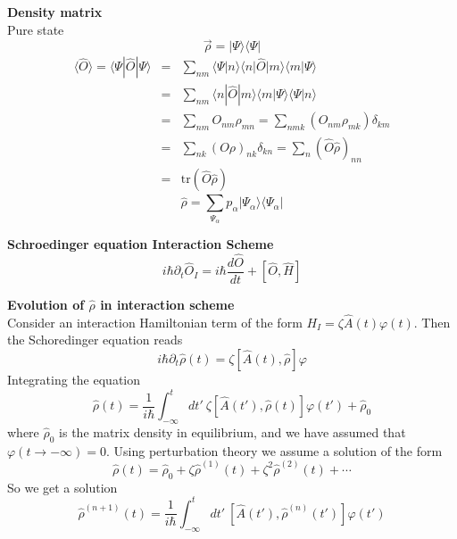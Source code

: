 \documentclass[12pt,a4paper]{article}
\newcommand{\dt}[1]{\frac{d #1}{dt}} %
\newcommand{\integral}[3]{\int_{#1}^{#2} d #3 \ } %
\begin{document}
\textbf{Density matrix}\\
Pure state
\begin{equation}
	\vec{\rho} = |\Psi \rangle \langle \Psi|
\end{equation}
\begin{eqnarray}
	\langle  \hat{O} \rangle = \langle \Psi | \hat{O}|\Psi \rangle & = & \sum_{nm} \langle \Psi |n \rangle \langle n | \hat{O}|m \rangle\langle m  |\Psi  \rangle \\
	& = & \sum_{nm}  \langle n | \hat{O}|m \rangle\langle m  |\Psi  \rangle \langle \Psi |n \rangle \\
	& = &\sum_{nm} O_{nm}\rho_{mn} = \sum_{nmk} (O_{nm}\rho_{mk})\delta_{km}\\
	& = & \sum_{nk} (O\rho)_{nk}\delta_{kn} = \sum_{n} (\hat{O}\hat{\rho})_{nn} \\
	& = & \text{tr}(\hat{O}\hat{\rho})
\end{eqnarray}
\begin{equation}
	\hat{\rho} = \sum_{\Psi_{\alpha}}p_{\alpha} |\Psi_{\alpha} \rangle \langle \Psi_{\alpha}|
\end{equation}

\textbf{Schroedinger equation Interaction Scheme}\\
\begin{equation}
	i\hbar\partial_t \hat{O}_I = i\hbar \dt{\hat{O}} + [\hat{O},\hat{H}]
\end{equation}

\textbf{Evolution of $\hat{\rho}$ in interaction scheme} \\
Consider an interaction Hamiltonian term of the form $H_I = \zeta \hat{A}(t)\varphi(t)$. Then the Schoredinger equation reads
\begin{equation}
	i\hbar\partial_t \hat{\rho}(t) = \zeta [\hat{A}(t),\hat{\rho}]\varphi
\end{equation}
Integrating the equation
\begin{equation}
	\hat{\rho}(t) = \frac{1}{i\hbar} \integral{-\infty}{t}{t'} \zeta [\hat{A}(t'),\hat{\rho}(t)]\varphi(t') + \hat{\rho}_0
\end{equation}
where $\hat{\rho}_0$ is the matrix density in equilibrium, and we have assumed that $\varphi(t\rightarrow - \infty) = 0$.
Using perturbation theory we assume a solution of the form
\begin{equation}
	\hat{\rho}(t) =  \hat{\rho}_0 +\zeta\hat{\rho}^{(1)}(t) +\zeta^2\hat{\rho}^{(2)}(t) + \cdots
\end{equation}
So we get a solution
\begin{equation}
	\hat{\rho}^{(n+1)}(t) = \frac{1}{i\hbar}\integral{-\infty}{t}{t'}[\hat{A}(t'                                                                                                                           ),\hat{\rho}^{(n)}(t')]\varphi(t')
\end{equation}
\end{document}
